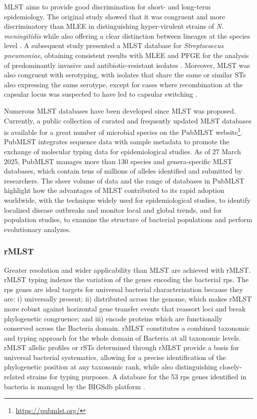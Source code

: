 \ac{MLST} aims to provide good discrimination for short- and long-term epidemiology. The original study showed that it was congruent and more discriminatory than \ac{MLEE} in distinguishing hyper-virulent strains of \textit{N. meningitidis} while also offering a clear distinction between lineages at the species level \cite{enright_multilocus_1999}. A subsequent study presented a \ac{MLST} database for \textit{Streptococcus pneumoniae}, obtaining consistent results with \ac{MLEE} and \ac{PFGE} for the analysis of predominantly invasive and antibiotic-resistant isolates \cite{enright_multilocus_1998}. Moreover, \ac{MLST} was also congruent with serotyping, with isolates that share the same or similar \ac{ST}s also expressing the same serotype, except for cases where recombination at the capsular locus was suspected to have led to capsular switching \cite{enright_multilocus_1999}.

Numerous \ac{MLST} databases have been developed since \ac{MLST} was proposed. Currently, a public collection of curated and frequently updated \ac{MLST} databases is available for a great number of microbial species on the PubMLST website\footnote{\url{https://pubmlst.org/}}. PubMLST integrates sequence data with sample metadata to promote the exchange of molecular typing data for epidemiological studies. As of 27 March 2025, PubMLST manages more than 130 species and genera-specific \ac{MLST} databases, which contain tens of millions of alleles identified and submitted by researchers. The sheer volume of data and the range of databases in PubMLST highlight how the advantages of \ac{MLST} contributed to its rapid adoption worldwide, with the technique widely used for epidemiological studies, to identify localized disease outbreaks and monitor local and global trends, and for population studies, to examine the structure of bacterial populations and perform evolutionary analyzes.

\subsubsection{rMLST}

Greater resolution and wider applicability than \ac{MLST} are achieved with \ac{rMLST}. \ac{rMLST} typing indexes the variation of the genes encoding the bacterial \ac{rps}. The \ac{rps} genes are ideal targets for universal bacterial characterization because they are: i) universally present; ii) distributed across the genome, which makes \ac{rMLST} more robust against horizontal gene transfer events that reassort loci and break phylogenetic congruence; and iii) encode proteins which are functionally conserved across the Bacteria domain. \ac{rMLST} constitutes a combined taxonomic and typing approach for the whole domain of Bacteria at all taxonomic levels. \ac{rMLST} allelic profiles or \ac{rSTs} determined through \ac{rMLST} provide a basis for universal bacterial systematics, allowing for a precise identification of the phylogenetic position at any taxonomic rank, while also distinguishing closely-related strains for typing purposes. A database for the 53 \ac{rps} genes identified in bacteria is managed by the \ac{BIGSdb} platform \cite{maiden_mlst_2013}.

